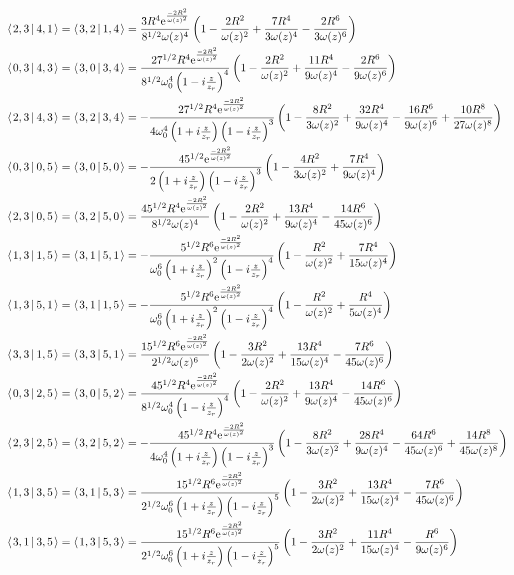 \documentclass[11pt]{amsart}
\makeatletter
\newcommand{\e}{{\rm e}}				%
\newcommand{\msp}[1]{\mspace{#1mu}}		%
\newcommand{\0}{\varnothing}		%
\newcommand{\brac}[2]{\left\langle\msp{2} #1\left\lvert \msp{3.5} #2 \right.\right\rangle}	%
\newcommand{\1}{!}
\newcommand{\2}{@}
\newcommand{\3}{\#}
\newcommand{\4}{\$}
\newcommand{\5}{\%}
\newcommand{\6}{$^\wedge$}
\newcommand{\7}{\&}
\newcommand{\8}{*}
\newcommand{\9}{(}
\makeatother
\begin{document}
\begin{align*}
&
\brac{2,3}{4,1} = \brac{3,2}{1,4} = \frac{3R^4\e^{\frac{-2R^2}{\omega(z)^2}}}{8^{1/2}\omega(z)^4}\left(1-\frac{2R^2}{\omega(z)^2}+\frac{7R^4}{3\omega(z)^4}-\frac{2R^6}{3\omega(z)^6}\right)
\\
&
\brac{0,3}{4,3} = \brac{3,0}{3,4} =\frac{27^{1/2}R^4\e^{\frac{-2R^2}{\omega(z)^2}}}{8^{1/2}\omega_0^4\left(1-i\frac{z}{z_r}\right)^4}\left(1-\frac{2R^2}{\omega(z)^2}+\frac{11R^4}{9\omega(z)^4}-\frac{2R^6}{9\omega(z)^6}\right)
\\
&
\brac{2,3}{4,3} = \brac{3,2}{3,4} = -\frac{27^{1/2}R^4\e^{\frac{-2R^2}{\omega(z)^2}}}{4\omega_0^4\left(1+i\frac{z}{z_r}\right)\left(1-i\frac{z}{z_r}\right)^3}\left(1-\frac{8R^2}{3\omega(z)^2}+\frac{32R^4}{9\omega(z)^4}-\frac{16R^6}{9\omega(z)^6}+\frac{10R^8}{27\omega(z)^8}\right)
\\
&
\brac{0,3}{0,5} = \brac{3,0}{5,0} = -\frac{45^{1/2}\e^{\frac{-2R^2}{\omega(z)^2}}}{2\left(1+i\frac{z}{z_r}\right)\left(1-i\frac{z}{z_r}\right)^3}\left(1-\frac{4R^2}{3\omega(z)^2}+\frac{7R^4}{9\omega(z)^4}\right)
\\
&
\brac{2,3}{0,5} = \brac{3,2}{5,0} = \frac{45^{1/2}R^4\e^{\frac{-2R^2}{\omega(z)^2}}}{8^{1/2}\omega(z)^4}\left(1-\frac{2R^2}{\omega(z)^2}+\frac{13R^4}{9\omega(z)^4}-\frac{14R^6}{45\omega(z)^6}\right)
\\
&
\brac{1,3}{1,5} = \brac{3,1}{5,1} =-\frac{5^{1/2}R^6\e^{\frac{-2R^2}{\omega(z)^2}}}{\omega_0^6\left(1+i\frac{z}{z_r}\right)^2\left(1-i\frac{z}{z_r}\right)^4}\left(1-\frac{R^2}{\omega(z)^2}+\frac{7R^4}{15\omega(z)^4}\right)
\\
&
\brac{1,3}{5,1} = \brac{3,1}{1,5} =-\frac{5^{1/2}R^6\e^{\frac{-2R^2}{\omega(z)^2}}}{\omega_0^6\left(1+i\frac{z}{z_r}\right)^2\left(1-i\frac{z}{z_r}\right)^4}\left(1-\frac{R^2}{\omega(z)^2}+\frac{R^4}{5\omega(z)^4}\right)
\\
&
\brac{3,3}{1,5} = \brac{3,3}{5,1} = \frac{15^{1/2}R^6\e^{\frac{-2R^2}{\omega(z)^2}}}{2^{1/2}\omega(z)^6}\left(1-\frac{3R^2}{2\omega(z)^2}+\frac{13R^4}{15\omega(z)^4}-\frac{7R^6}{45\omega(z)^6}\right)
\\
&
\brac{0,3}{2,5} = \brac{3,0}{5,2} = \frac{45^{1/2}R^4\e^{\frac{-2R^2}{\omega(z)^2}}}{8^{1/2}\omega_0^4\left(1-i\frac{z}{z_r}\right)^4}\left(1-\frac{2R^2}{\omega(z)^2}+\frac{13R^4}{9\omega(z)^4}-\frac{14R^6}{45\omega(z)^6}\right)
\\
&
\brac{2,3}{2,5} = \brac{3,2}{5,2} =- \frac{45^{1/2}R^4\e^{\frac{-2R^2}{\omega(z)^2}}}{4\omega_0^4\left(1+i\frac{z}{z_r}\right)\left(1-i\frac{z}{z_r}\right)^3}\left(1-\frac{8R^2}{3\omega(z)^2}+\frac{28R^4}{9\omega(z)^4}-\frac{64R^6}{45\omega(z)^6}+\frac{14R^8}{45\omega(z)^8}\right)
\\
&
\brac{1,3}{3,5} = \brac{3,1}{5,3} =\frac{15^{1/2}R^6\e^{\frac{-2R^2}{\omega(z)^2}}}{2^{1/2}\omega_0^6\left(1+i\frac{z}{z_r}\right)\left(1-i\frac{z}{z_r}\right)^5}\left(1-\frac{3R^2}{2\omega(z)^2}+\frac{13R^4}{15\omega(z)^4}-\frac{7R^6}{45\omega(z)^6}\right)
\\
&
\brac{3,1}{3,5} = \brac{1,3}{5,3} = \frac{15^{1/2}R^6\e^{\frac{-2R^2}{\omega(z)^2}}}{2^{1/2}\omega_0^6\left(1+i\frac{z}{z_r}\right)\left(1-i\frac{z}{z_r}\right)^5}\left(1-\frac{3R^2}{2\omega(z)^2}+\frac{11R^4}{15\omega(z)^4}-\frac{R^6}{9\omega(z)^6}\right)
\end{align*}
\end{document}
